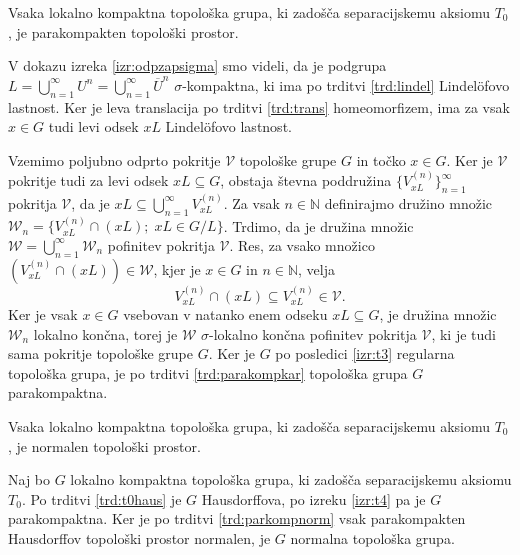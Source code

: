 \documentclass[mat1]{fmfdelo}
\newcommand{\N}{\mathbb N}
\newcommand{\closure}[1]{\overline{#1}}
\begin{document}
\begin{izrek}\label{izr:t4}
	Vsaka lokalno kompaktna topološka grupa, ki zadošča separacijskemu aksiomu $T_0$, je parakompakten topološki prostor.
\end{izrek}

\begin{dokaz}
V dokazu izreka \ref{izr:odpzapsigma} smo videli, da je podgrupa $L = \bigcup_{n = 1}^\infty U^n = \bigcup_{n = 1}^\infty \closure{U}^n$ $\sigma$-kompaktna, ki ima po trditvi \ref{trd:lindel} Lindel\"ofovo lastnost. Ker je leva translacija po trditvi \ref{trd:trans} homeomorfizem, ima za vsak $x \in G$ tudi levi odsek $xL$ Lindel\"ofovo lastnost.

Vzemimo poljubno odprto pokritje $\mathcal{V}$ topološke grupe $G$ in točko $x \in G$.
Ker je $\mathcal{V}$ pokritje tudi za levi odsek $xL \subseteq G$, obstaja števna poddružina $\lbrace V_{xL}^{(n)} \rbrace_{n = 1}^{\infty}$ pokritja $\mathcal{V}$, da je $xL \subseteq \bigcup_{n=1}^{\infty}V_{xL}^{(n)}$. Za vsak $n \in \N$ definirajmo družino množic $\mathcal{W}_n = \lbrace V_{xL}^{(n)} \cap (xL) ;\; xL \in G/L \rbrace$.
Trdimo, da je družina množic $\mathcal{W} = \bigcup_{n=1}^{\infty}\mathcal{W}_n$ pofinitev pokritja $\mathcal{V}$. Res, za vsako množico $(V_{xL}^{(n)} \cap (xL)) \in \mathcal{W}$, kjer je $x \in G$ in $n \in \N$, velja
\[ V_{xL}^{(n)} \cap (xL) \subseteq V_{xL}^{(n)} \in \mathcal{V}. \]
Ker je vsak $x \in G$ vsebovan v natanko enem odseku $xL \subseteq G$, je družina množic $\mathcal{W}_n$ lokalno končna, torej je $\mathcal{W}$ $\sigma$-lokalno končna pofinitev pokritja $\mathcal{V}$, ki je tudi sama pokritje topološke grupe $G$. Ker je $G$ po posledici \ref{izr:t3} regularna topološka grupa, je po trditvi \ref{trd:parakompkar} topološka grupa $G$ parakompaktna.
\end{dokaz}

\begin{posledica}
Vsaka lokalno kompaktna topološka grupa, ki zadošča separacijskemu aksiomu $T_0$, je normalen topološki prostor.
\end{posledica}

\begin{dokaz}
Naj bo $G$ lokalno kompaktna topološka grupa, ki zadošča separacijskemu aksiomu $T_0$. Po trditvi \ref{trd:t0haus} je $G$ Hausdorffova, po izreku \ref{izr:t4} pa je $G$ parakompaktna. Ker je po trditvi \ref{trd:parkompnorm} vsak parakompakten Hausdorffov topološki prostor normalen, je $G$ normalna topološka grupa.
\end{dokaz}
\end{document}
